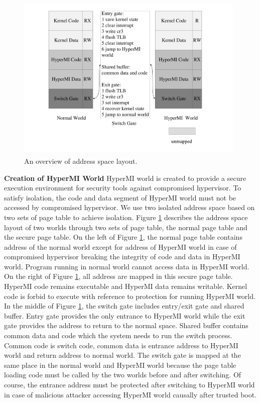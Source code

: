 \documentclass[conference]{IEEEtran}
\begin{document}
\begin{figure}
\centerline{\includegraphics[width=11cm, height=8cm]{pdfvmcs2.pdf}}%
\caption{An overview of address space layout.} \label{fig2}
\end{figure}


\textbf{Creation of HyperMI World}
HyperMI world is created to provide a secure execution environment for security tools against compromised hypervisor. To satisfy isolation, the code and data segment of HyperMI world must not be accessed by compromised hypervisor. We use two isolated address space based on two sets of page table to achieve isolation.
Figure \ref{fig2} describes the address space layout of two worlds through two sets of page table, the normal page table and the secure page table. On the left of Figure \ref{fig2}, the normal page table contains address of the normal world except for address of HyperMI world in case of compromised hypervisor breaking the integrity of code and data in HyperMI world. Program running in normal world cannot access data in HyperMI world. On the right of Figure \ref{fig2}, all address are mapped in this secure page table.
HyperMI code remains executable and HyperMI data remains writable. Kernel code is forbid to execute with reference to protection for running HyperMI world. 
In the middle of Figure \ref{fig2}, the switch gate includes entry/exit gate and shared buffer. Entry gate provides the only entrance to HyperMI world while the exit gate provides the address to return to the normal space. Shared buffer contains common data and code which the system needs to run the switch process. Common code is switch code, common data is entrance address to HyperMI world and return address to normal world. The switch gate is mapped at the same place in the normal world and HyperMI world because the page table loading code must be called by the two worlds before and after switching. Of course, the entrance address must be protected after switching to HyperMI world in case of malicious attacker accessing HyperMI world causally after trusted boot. 
\end{document}
